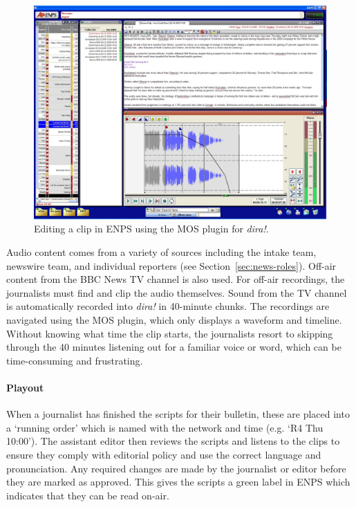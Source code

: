 \begin{figure}[ht]
  \centering
  \includegraphics[width=\columnwidth]{figs/news-enps-edit.jpg}
  \caption{Editing a clip in ENPS using the MOS plugin for \textit{dira!}.}
  \label{fig:news-enps-edit}
\end{figure}

Audio content comes from a variety of sources including the intake team, newswire team, and individual reporters (see
Section~\ref{sec:news-roles}).  Off-air content from the BBC News TV channel is also used.  For off-air recordings, the
journalists must find and clip the audio themselves. Sound from the TV channel is automatically recorded into
\textit{dira!} in 40-minute chunks. The recordings are navigated using the MOS plugin, which only displays a waveform
and timeline. Without knowing what time the clip starts, the journalists resort to skipping through the 40 minutes
listening out for a familiar voice or word, which can be time-consuming and frustrating.

\paragraph{Playout}
When a journalist has finished the scripts for their bulletin, these are placed into a `running order' which is named
with the network and time (e.g. `R4 Thu 10:00'). The assistant editor then reviews the scripts and listens to the clips
to ensure they comply with editorial policy and use the correct language and pronunciation.  Any required changes are
made by the journalist or editor before they are marked as approved. This gives the scripts a green label in ENPS which
indicates that they can be read on-air.

